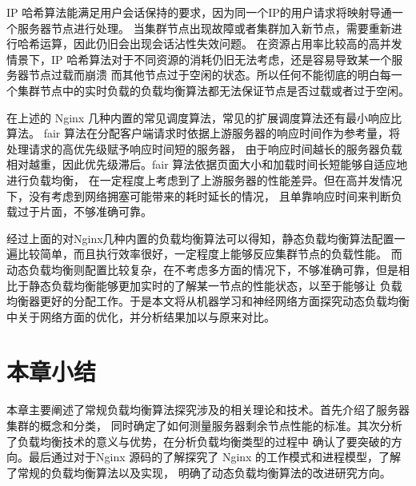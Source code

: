 IP 哈希算法能满足用户会话保持的要求，因为同一个IP的用户请求将映射导通一个服务器节点进行处理。
当集群节点出现故障或者集群加入新节点，需要重新进行哈希运算，因此仍旧会出现会话沾性失效问题。
在资源占用率比较高的高并发情景下，IP 哈希算法对于不同资源的消耗仍旧无法考虑，还是容易导致某一个服务器节点过载而崩溃
而其他节点过于空闲的状态。所以任何不能彻底的明白每一个集群节点中的实时负载的负载均衡算法都无法保证节点是否过载或者过于空闲。

在上述的 Nginx 几种内置的常见调度算法，常见的扩展调度算法还有最小响应比算法。
fair 算法在分配客户端请求时依据上游服务器的响应时间作为参考量，将处理请求的高优先级赋予响应时间短的服务器，
由于响应时间越长的服务器负载相对越重，因此优先级滞后。fair 算法依据页面大小和加载时间长短能够自适应地进行负载均衡，
在一定程度上考虑到了上游服务器的性能差异。但在高并发情况下，没有考虑到网络拥塞可能带来的耗时延长的情况，
且单靠响应时间来判断负载过于片面，不够准确可靠\cite{张艳肖2023基于Fair函数神经网络的厚度传感器输出特性分析}。

经过上面的对Nginx几种内置的负载均衡算法可以得知，静态负载均衡算法配置一遍比较简单，而且执行效率很好，一定程度上能够反应集群节点的负载性能。
而动态负载均衡则配置比较复杂，在不考虑多方面的情况下，不够准确可靠，但是相比于静态负载均衡能够更加实时的了解某一节点的性能状态，以至于能够让
负载均衡器更好的分配工作。于是本文将从机器学习和神经网络方面探究动态负载均衡中关于网络方面的优化，并分析结果加以与原来对比。

\section{本章小结}

本章主要阐述了常规负载均衡算法探究涉及的相关理论和技术。首先介绍了服务器集群的概念和分类，
同时确定了如何测量服务器剩余节点性能的标准。其次分析了负载均衡技术的意义与优势，在分析负载均衡类型的过程中
确认了要突破的方向。最后通过对于Nginx 源码的了解探究了 Nginx 的工作模式和进程模型，了解了常规的负载均衡算法以及实现，
明确了动态负载均衡算法的改进研究方向。
